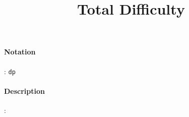 \documentclass[10pt,a4paper,oneside]{scrartcl}
\author{}
\title{Total Difficulty}
\date{}
\begin{document}
\maketitle
\paragraph{Notation}: \texttt{dp}
\paragraph{Description}: 
\end{document}
